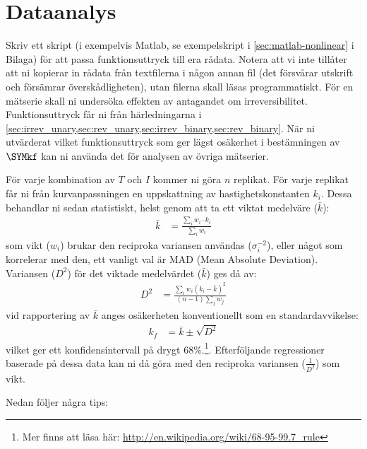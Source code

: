 \section{Dataanalys}
\label{sec:analys}
Skriv ett skript (i exempelvis Matlab, se exempelskript i
\cref{sec:matlab-nonlinear} i Bilaga) för att passa funktionsuttryck till
era rådata. Notera att vi inte tillåter att ni kopierar in rådata från
textfilerna i någon annan fil (det försvårar utskrift och försämrar
överskådligheten), utan filerna skall läsas programmatiskt. För en
mätserie skall ni undersöka effekten av antagandet om
irreversibilitet. Funktionsuttryck får ni från härledningarna i
\cref{sec:irrev_unary,sec:rev_unary,sec:irrev_binary,sec:rev_binary}.
När ni utvärderat vilket funktionsuttryck som ger lägst osäkerhet i
bestämningen av $\SYMkf$ kan ni använda det för analysen av övriga
mätserier.

För varje kombination av $T$ och $I$ kommer ni göra $n$ replikat. För
varje replikat får ni från kurvanpassningen en uppskattning av
hastighetskonstanten $k_i$. Dessa behandlar ni sedan statistiskt, helst
genom att ta ett viktat medelväre ($\bar{k}$):
\begin{align}
  \bar{k} &= \frac{\sum_i{w_i \cdot k_i}}{\sum_i{w_i}}
\end{align}
som vikt ($w_i$) brukar den reciproka variansen användas
($\sigma_i^{-2}$), eller något som korrelerar med den, ett vanligt val är
MAD (Mean Absolute Deviation). Variansen ($D^2$) för det viktade
medelvärdet ($\bar{k}$) ges då av:
\begin{align}
   D^2 &= \frac{\sum_i w_i(k_i - \bar{k})^2}{(n - 1)\sum_j w_j}
\end{align}
vid rapportering av $\bar{k}$ anges osäkerheten konventionellt som en
standardavvikelse:
\begin{align}
  k_f &= \bar{k} \pm \sqrt{D^2}
\end{align}
vilket ger ett konfidensintervall på drygt 68\%.\footnote{
Mer finns att läsa här:
\url{http://en.wikipedia.org/wiki/68-95-99.7\_rule}
}. Efterföljande regressioner baserade på dessa
data kan ni då göra med den reciproka variansen ($\frac{1}{D^2}$) som
vikt.

Nedan följer några tips:

